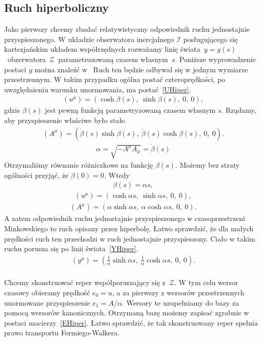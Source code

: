 \subsection{Ruch hiperboliczny}
Jako pierwszy chcemy zbadać relatywistyczny 
odpowiednik ruchu jednostajnie 
przyspieszonego.
W układzie obserwatora inercjalnego $\mathcal{I}$ posługującego się 
kartezjańskim układem współrzędnych rozważamy linię 
świata~$y=y(s)$~obzerwatora~$\mathcal{Z}$~parametruzowaną 
czasem własnym~$s$.
Poniższe wyprowadzenie postaci $y$ można znaleźć 
w~\cite{trau1984, Ashtekar20141}
Ruch ten będzie odbywał się w jednym wymiarze przestrzennym. 
W takim przypadku ogólna postać czteroprędkości, po uwzględnieniu warunku 
unormowania, ma postać~\eqref{UHiper}.
\begin{align}\label{UHiper}
(u^\mu) = (\cosh \beta( s ),\ \sinh \beta( s ),\ 0,\   0),
\end{align}
gdzie $\beta( s)$ jest pewną funkcją parametryzowaną czasem własnym $s$.
Rządamy, aby przyspieszenie właściwe było stałe.
\begin{align}\nonumber
(A^\mu) = ( \dot{\beta}( s ) \sinh \beta( s ),\ 
\dot{\beta}( s ) \cosh \beta( s ),\ 0,\ 0 ).
\end{align}
\begin{align}\nonumber
\alpha = \sqrt{ - A^\mu A_\mu } = \dot{\beta}( s )
\end{align}
Otrzymaliśmy równanie różniczkowe na funkcję $\beta(s)$. 
Możemy bez straty ogólności przyjąć, że $\beta(0)  = 0$. Wtedy
\begin{align}\nonumber
\beta( s ) = \alpha s,
\end{align}
\begin{align}\nonumber
(u^\mu) = (\cosh \alpha s ,\ \sinh \alpha s ,\ 0,\   0),
\end{align}
\begin{align}\nonumber
(A^\mu) = ( \alpha \sinh \alpha s,\ \alpha \cosh \alpha s,\ 0,\ 0 ).
\end{align}
A zatem odpowiednik ruchu jednostajnie przyspieszonego w
czasoprzestrzeni Minkowskiego to ruch opisany przez hiperbolę.
Łatwo sprawdzić, że dla małych prędkości ruch ten przechodzi 
w ruch jednostajnie przyspieszony. Ciało w takim ruchu porusza
się po linii świata~\eqref{YHiper}.
\begin{align}\label{YHiper}
(y^\mu) = \left( \frac{1}{\alpha} \sinh \alpha s,\ 
\frac{1}{\alpha} \cosh \alpha s,\ 0,\ 0 \right).
\end{align}
\\
Chcemy skonstruować reper współporuszający się z~$\mathcal{Z}$. 
W tym celu wersor czasowy obieramy prędkość $e_0 = u$, 
a za pierwszy z wersorów przestrzennych unormowane 
przyspieszenie $e_1 = A/\alpha$.
Wersory te uzupełniamy do bazy za pomocą wersorów kanonicznych.
Otrzymaną bazę możemy zapisać zgrabnie w postaci 
macierzy~\eqref{EHiper}.
Łatwo sprawdzić, że tak skonstruowany reper spełnia
prawo transportu Fermiego-Walkera.

